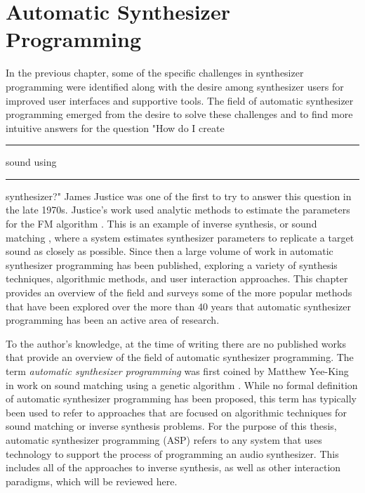 \chapter{Automatic Synthesizer Programming}
\label{chapter:asp-background}

In the previous chapter, some of the specific challenges in synthesizer programming were identified along with the desire among synthesizer users for improved user interfaces and supportive tools. The field of automatic synthesizer programming emerged from the desire to solve these challenges and to find more intuitive answers for the question "How do I create \rule{1cm}{0.15mm} sound using \rule{1cm}{0.15mm} synthesizer?" James Justice \cite{justice1979analytic} was one of the first to try to answer this question in the late 1970s. Justice's work used analytic methods to estimate the parameters for the FM algorithm \cite{chowning1973synthesis}. This is an example of inverse synthesis, or sound matching \cite{horner1993machine}, where a system estimates synthesizer parameters to replicate a target sound as closely as possible. Since then a large volume of work in automatic synthesizer programming has been published, exploring a variety of synthesis techniques, algorithmic methods, and user interaction approaches. This chapter provides an overview of the field and surveys some of the more popular methods that have been explored over the more than 40 years that automatic synthesizer programming has been an active area of research.

To the author's knowledge, at the time of writing there are no published works that provide an overview of the field of automatic synthesizer programming. The term \textit{automatic synthesizer programming} was first coined by Matthew Yee-King in work on sound matching using a genetic algorithm \cite{yee2008synthbot}. While no formal definition of automatic synthesizer programming has been proposed, this term has typically been used to refer to approaches that are focused on algorithmic techniques for sound matching or inverse synthesis problems. For the purpose of this thesis, automatic synthesizer programming (ASP) refers to any system that uses technology to support the process of programming an audio synthesizer. This includes all of the approaches to inverse synthesis, as well as other interaction paradigms, which will be reviewed here.

